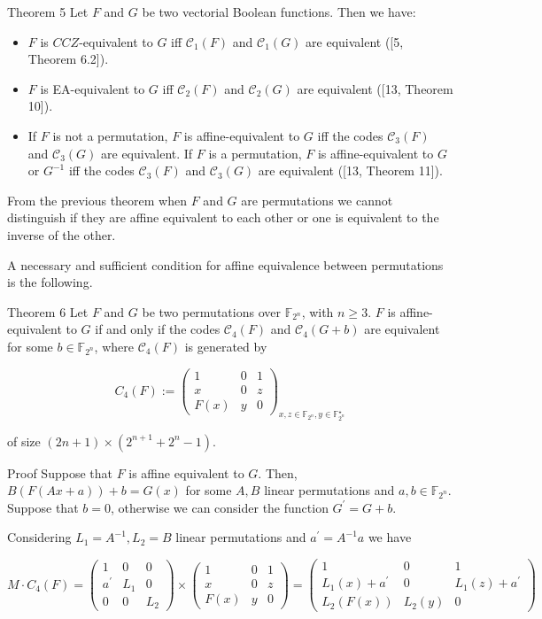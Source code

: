 \documentclass[10pt]{article}
\begin{document}
Theorem 5 Let $F$ and $G$ be two vectorial Boolean functions. Then we have:

\begin{itemize}
  \item $F$ is $C C Z$-equivalent to $G$ iff $\mathscr{C}_{1}(F)$ and $\mathscr{C}_{1}(G)$ are equivalent ([5, Theorem 6.2]).
  \item $F$ is EA-equivalent to $G$ iff $\mathscr{C}_{2}(F)$ and $\mathscr{C}_{2}(G)$ are equivalent ([13, Theorem 10]).
  \item If $F$ is not a permutation, $F$ is affine-equivalent to $G$ iff the codes $\mathscr{C}_{3}(F)$ and $\mathscr{C}_{3}(G)$ are equivalent. If $F$ is a permutation, $F$ is affine-equivalent to $G$ or $G^{-1}$ iff the codes $\mathscr{C}_{3}(F)$ and $\mathscr{C}_{3}(G)$ are equivalent ([13, Theorem 11]).
\end{itemize}

From the previous theorem when $F$ and $G$ are permutations we cannot distinguish if they are affine equivalent to each other or one is equivalent to the inverse of the other.

A necessary and sufficient condition for affine equivalence between permutations is the following.

Theorem 6 Let $F$ and $G$ be two permutations over $\mathbb{F}_{2^{n}}$, with $n \geq 3$. $F$ is affine-equivalent to $G$ if and only if the codes $\mathscr{C}_{4}(F)$ and $\mathscr{C}_{4}(G+b)$ are equivalent for some $b \in \mathbb{F}_{2^{n}}$, where $\mathscr{C}_{4}(F)$ is generated by

$$
C_{4}(F):=\left(\begin{array}{ccc}
1 & 0 & 1 \\
x & 0 & z \\
F(x) & y & 0
\end{array}\right)_{x, z \in \mathbb{F}_{2^{n}}, y \in \mathbb{F}_{2^{n}}^{\star}}
$$

of size $(2 n+1) \times\left(2^{n+1}+2^{n}-1\right)$.

Proof Suppose that $F$ is affine equivalent to $G$. Then, $B(F(A x+a))+b=G(x)$ for some $A, B$ linear permutations and $a, b \in \mathbb{F}_{2^{n}}$. Suppose that $b=0$, otherwise we can consider the function $G^{\prime}=G+b$.

Considering $L_{1}=A^{-1}, L_{2}=B$ linear permutations and $a^{\prime}=A^{-1} a$ we have

$$
M \cdot C_{4}(F)=\left(\begin{array}{ccc}
1 & 0 & 0 \\
a^{\prime} & L_{1} & 0 \\
0 & 0 & L_{2}
\end{array}\right) \times\left(\begin{array}{ccc}
1 & 0 & 1 \\
x & 0 & z \\
F(x) & y & 0
\end{array}\right)=\left(\begin{array}{ccc}
1 & 0 & 1 \\
L_{1}(x)+a^{\prime} & 0 & L_{1}(z)+a^{\prime} \\
L_{2}(F(x)) & L_{2}(y) & 0
\end{array}\right)
$$
\end{document}
